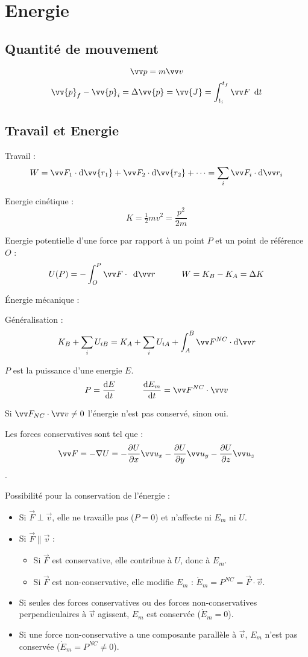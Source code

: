 \documentclass[../main.tex]{subfiles}
\begin{document}
\section{Energie}
\subsection{Quantité de mouvement}
\[
  \qm=m\vi
\]
\[
  \vv{p}_f - \vv{p}_i = \Delta\vv{p} = \vv{J} = \int_{t_i}^{t_f}\F\dee{t}
\]

\subsection{Travail et Energie}

Travail : 
\[
  W= \F_1\cdot\mathrm{d}\vv{r_1} + \F_2\cdot\mathrm{d}\vv{r_2} + \dots =\sum_i \F_i\cdot\mathrm{d}\pos_i
\]

Energie cinétique :
\[
  K = \tfrac{1}{2}mv^2 = \frac{p^2}{2m}
\]

Energie potentielle d'une force \F{} par rapport à un point \(P\) et un point de référence \(O\) : 
\[
  U(P)=-\int_O^P\F\cdot\dee{\pos}\phantom{texttex} W = K_B - K_A = \Delta K
\]

Énergie mécanique :

Généralisation : 
\[
  K_B + \sum_i U_{iB} = K_A + \sum_i U_{iA} + \int_A^B \F^{NC}\cdot\mathrm{d}\pos
\]

\(P\) est la puissance d'une energie \(E\). 
\[
  P = \dv{E}{t} \phantom{textext} \dv{E_m}{t} = \F^{NC}\cdot\vi
\]

Si \(\F_{NC}\cdot\vi \neq 0 \) l'énergie n'est pas conservé, sinon oui. 

Les forces conservatives sont tel que :
\[
  \F=-\nabla U=-\frac{\partial U}{\partial x}\ux-\frac{\partial U}{\partial y}\uy-\frac{\partial U}{\partial z}\uz
\].

Possibilité pour la conservation de l'énergie : 
\begin{itemize}
  \item Si \(\vec{F} \perp \vec{v}\), elle ne travaille pas (\(P = 0\)) et n'affecte ni \(E_m\) ni \(U\).
  \item Si \(\vec{F} \parallel \vec{v}\) :
    \begin{itemize}
      \item Si \(\vec{F}\) est conservative, elle contribue à \(U\), donc à \(E_m\).
      \item Si \(\vec{F}\) est non-conservative, elle modifie \(E_m\) : \(\dot{E}_m = P^{NC} = \vec{F} \cdot \vec{v}\).
    \end{itemize}
  \item Si seules des forces conservatives ou des forces non-conservatives perpendiculaires à \(\vec{v}\) agissent, \(E_m\) est conservée (\(\dot{E}_m = 0\)).
  \item Si une force non-conservative a une composante parallèle à \(\vec{v}\), \(E_m\) n'est pas conservée (\(\dot{E}_m = P^{NC} \neq 0\)).
\end{itemize}
\end{document}
